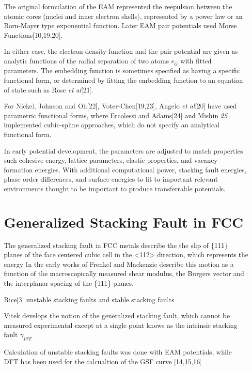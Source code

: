 The original formulation of the EAM represented the reepulsion between the atomic cores (nuclei and inner electron shells), represented by a power law or an Born-Mayer type exponential function.  Later EAM pair potentials used Morse Functions[10,19,20].

In either case, the electron density function and the pair potential are given as analytic functions of the radial separation of two atoms $r_{ij}$ with fitted parameters.  The embedding function is sometimes specified as having a specific functional form, or determined by fitting the embedding function to an equation of state such as Rose \emph{et al}[21].

For Nickel, Johnson and Oh[22], Voter-Chen[19,23], Angelo \emph{et al}[20] have used parametric functional forms, where Ercolessi and Adams[24] and Mishin \emph{25} implemented cubic-spline approaches, which do not specify an analytical functional form.

In early potential development, the parameters are adjusted to match properties such cohesive energy, lattice parameters, elastic properties, and vacancy formation energies.  With additional computational power, stacking fault energies, phase order differences, and surface energies to fit to important relevant environments thought to be important to produce transferrable potentials.

\section{Generalized Stacking Fault in FCC}
The generalized stacking fault in FCC metals describe the the slip of \{111\} planes of the face centered cubic cell in the <112> direction, which represents the energy
In the early works of Frenkel and Mackenzie describe this motion as a function of the macroscopically measured shear modulus, the Burgers vector and the interplanar spacing of the \{111\} planes.

Rice[3] unstable stacking faults and stable stacking faults

Vitek\cite{vitek1966_gsf,vitek1968_gsf} develops the notion of the generalized stacking fault, which cannot be measured experimental except at a single point knows as the intrinsic stacking fault $\gamma_{ISF}$

Calculation of unstable stacking faults\cite{sun1990_eam_esf,sun1993_eam_esf,farkas1997_eam_usf} was done with EAM potentials, while DFT has been used for the calcualtion of the GSF curve [14,15,16]

